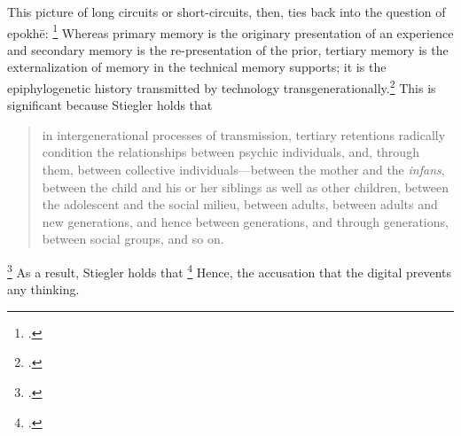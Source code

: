 \documentclass[letterpaper,notitlepage,12pt]{article}
\begin{document}
This picture of long circuits or short-circuits, then, ties back into the
question of epokh\={e}: \footcite[ch. 2.8]{stiegler_age_2019}
Whereas primary memory is the originary presentation of an experience and
secondary memory is the re-presentation of the prior, tertiary memory is the
externalization of memory in the technical memory supports; it is the
epiphylogenetic history transmitted by technology
transgenerationally.\footcite[p. 248]{stiegler_technics_1998}
This is significant because Stiegler holds that \blockquote{in intergenerational
  processes of transmission, tertiary retentions radically condition the
  relationships between psychic individuals, and, through them, between
  collective individuals---between the mother and the \textit{infans}, between
  the child and his or her siblings as well as other children, between the
  adolescent and the social milieu, between adults, between adults and new
  generations, and hence between generations, and through generations, between
social groups, and so on.}\footcite[ch. 2.8]{stiegler_age_2019}
As a result, Stiegler holds that \footcite[ch. 2.9]{stiegler_age_2019}
Hence, the accusation that the digital prevents any thinking.
\end{document}
